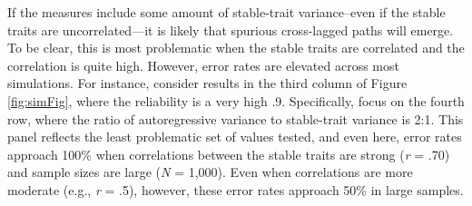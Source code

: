\documentclass[
  english,
  man,floatsintext]{apa6}
\begin{document}
If the measures include some amount of stable-trait variance--even if the stable traits are uncorrelated---it is likely that spurious cross-lagged paths will emerge. To be clear, this is most problematic when the stable traits are correlated and the correlation is quite high. However, error rates are elevated across most simulations. For instance, consider results in the third column of Figure \ref{fig:simFig}, where the reliability is a very high .9. Specifically, focus on the fourth row, where the ratio of autoregressive variance to stable-trait variance is 2:1. This panel reflects the least problematic set of values tested, and even here, error rates approach 100\% when correlations between the stable traits are strong (\emph{r} = .70) and sample sizes are large (\emph{N} = 1,000). Even when correlations are more moderate (e.g., \emph{r} = .5), however, these error rates approach 50\% in large samples.
\end{document}
